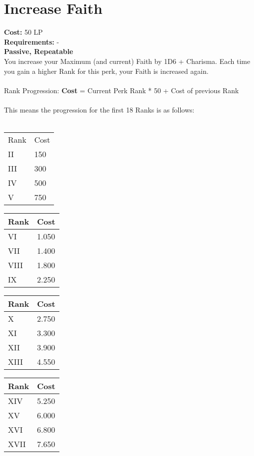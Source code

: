 \section{Increase Faith}\label{perk:increaseFaith}
\textbf{Cost:} 50 LP\\
\textbf{Requirements:} -\\
\textbf{Passive, Repeatable}\\
You increase your Maximum (and current) Faith by 1D6 + Charisma.
Each time you gain a higher Rank for this perk, your Faith is increased again.\\
\\
Rank Progression: \textbf{Cost} = Current Perk Rank * 50 + Cost of previous Rank\\
\\
This  means the progression for the first 18 Ranks is as follows:\\
\\
\begin{minipage}{0.25\textwidth}
    \begin{tabular}{l | l}
        Rank & Cost\\
        II & 150\\
        III & 300\\
        IV & 500\\
        V & 750\\
    \end{tabular}
\end{minipage}
\begin{minipage}{0.25\textwidth}
    \begin{tabular}{l | l}
        Rank & Cost\\ \hline
        VI & 1.050\\
        VII & 1.400\\
        VIII & 1.800\\
        IX & 2.250\\
    \end{tabular}
\end{minipage}
\begin{minipage}{0.25\textwidth}
    \begin{tabular}{l | l}
        Rank & Cost\\ \hline
        X & 2.750\\
        XI & 3.300\\
        XII & 3.900\\
        XIII & 4.550\\
    \end{tabular}
\end{minipage}
\begin{minipage}{0.25\textwidth}
    \begin{tabular}{l | l}
        Rank & Cost\\ \hline
        XIV & 5.250\\
        XV & 6.000\\
        XVI & 6.800\\
        XVII & 7.650\\
    \end{tabular}
\end{minipage}